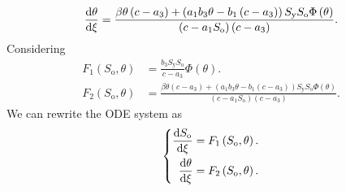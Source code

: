 \begin{equation}
	\label{ec39c}
	\diff{\theta}{\xi}=
	\frac{\beta\theta\left(c-a_{3}\right)+\left(a_{1}b_{3}\theta-b_{1}\left(c-a_{3}\right)\right)S_{\text{y}}S_{\text{o}}\Phi\left(\theta\right)}{\left(c-a_{1}S_{\text{o}}\right)\left(c -a_{3}\right)}.
\end{equation}
Considering
\begin{align*}
	F_{1}\left(S_{\text{o}},\theta\right) & =
	\frac{b_{3}S_{\text{y}}S_{\text{o}}}{c-a_{3}}
	\Phi\left(\theta\right).
	\\
	F_{2}\left(S_{\text{o}},\theta\right) & =
	\frac{\beta\theta\left(c-a_{3}\right)+\left(a_{1}b_{3}\theta-b_{1}\left(c-a_{3}\right)\right)S_{\text{y}}S_{\text{o}}\Phi\left(\theta\right)}{\left(c-a_{1}S_{\text{o}}\right)\left(c -a_{3}\right)}.
\end{align*}
We can rewrite the ODE system as
\begin{equation}\label{eq:system}
	\left\{
	\begin{aligned}
		\diff{S_{\text{o}}}{\xi} & =
		F_{1}\left(S_{\text{o}},\theta\right). \\
		\diff{\theta}{\xi}       & =
		F_{2}\left(S_{\text{o}},\theta\right).
	\end{aligned}
	\right.
\end{equation}



